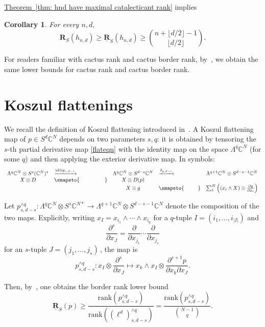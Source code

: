 \documentclass[11pt]{article}
\numberwithin{equation}{section}
\newtheorem{corollary}[theorem]{Corollary}
\theoremstyle{definition}
\theoremstyle{plain}
\newcommand{\expref}[2]{\hyperref[#2]{#1~\ref{#2}}}
\newcommand{\vvirg}{ , \dots , }
\providecommand{\textsum}{}
\renewcommand{\textsum}{{\textstyle \sum}}
\providecommand{\textfrac}{}
\renewcommand{\textfrac}[2]{{\textstyle \frac{#1}{#2}}}
\newcommand{\bfR}{\mathbf{R}}
\newcommand{\bbC}{\mathbb{C}}
\newcommand{\id}{\mathrm{id}}
\newcommand{\uline}[1]{\underline{#1}}
\def\BC{\mathbb C}
\def\ww{\wedge}
\def\trank{\mathrm{rank}}
\newcommand{\xto}[1]{\xrightarrow{#1}}
\begin{document}
\expref{Theorem}{thm: hnd have maximal catalecticant rank} implies
\begin{corollary}
For every $n,d$,  
 \[
\bfR_S(h_{n,d}) \geq  \uline{\bfR}_S(h_{n,d}) \geq \binom{n+\lfloor d/2 \rfloor -1}{\lfloor d/2 \rfloor}.
 \]
\end{corollary}
For readers familiar with cactus rank and cactus border rank, by~\cite[Thm. 5.3D]{MR1735271}, we obtain the same lower bounds for cactus rank and cactus border rank. 
 
\section{Koszul flattenings}
We recall the definition of Koszul flattening introduced in~\cite{MR3081636}. A Koszul flattening map of $p \in S^d \bbC^N$ depends on two parameters $s,q$: it is obtained by tensoring the $s$-th partial derivative map \eqref{flateqn} with the identity map on the space $\Lambda^q \BC^N$ (for some $q$) and then applying the exterior derivative map. In symbols: %
\begin{align*}
\begin{array}{clclc}
 \Lambda^q \bbC^N \otimes S^{s} (\bbC^N)^* &\xto{\id \otimes p_{s,d-s}} &\Lambda^q \bbC^N \otimes S^{d-s} \bbC^N & \xto{\delta_{q,d-s}}&\Lambda^{q+1} \bbC^N \otimes S^{d-s-1} \bbC^N \\
 X \otimes D &\xmapsto{\phantom{\id \otimes p_{s,d-s}}} & X \otimes D(p) & &  \\
 & &  X \otimes g & \xmapsto{\phantom{\delta_{q,d-s}}} &\textsum_1^N \left((x_i \wedge X) \otimes \textfrac{\partial g}{\partial x_i}\right)
\end{array}
 \end{align*}

 Let $p_{s,d-s}^{\ww q}:\Lambda^q \BC^N \otimes S^s\BC^{N*} \to \Lambda^{q+1}\BC^N\otimes S^{d-s-1}\BC^N$ denote the composition of the two maps. Explicitly, writing $x_I=x_{i_1}\ww \cdots \ww x_{i_{q}}$ for a $q$-tuple $I = (i_1 \vvirg i_{\vert I\vert})$ and
 \[
   \frac{\partial^{s}  }{\partial x_{J}}=\frac{\partial  }{\partial x_{j_1}}\cdots \frac{\partial  }{\partial x_{j_s}}
 \]
 for an $s$-tuple $J = (j_1 \vvirg j_s)$\,, the map is
\[
p_{s,d-s}^{\ww q}:  x_{I}\otimes \frac{\partial^{s}  }{\partial x_{J}}
\mapsto x_k\ww x_I\otimes \frac{\partial^{s+1} p }{\partial x_k \partial x_{J}}.
\]


Then, by~\cite[Prop 4.1.1]{MR3081636}, one obtains the border rank lower bound
\begin{equation}\label{eqn: Koszul flat bound for border rank}
\uline{\bfR}_S(p)\geq \frac{\trank(p_{s,d-s}^{\ww q})}{\trank((\ell^d)_{s,d-s}^{\ww q})}= \frac{\trank(p_{s,d-s}^{\ww q})}
{\binom{N-1}{q}}.
\end{equation}
\end{document}
